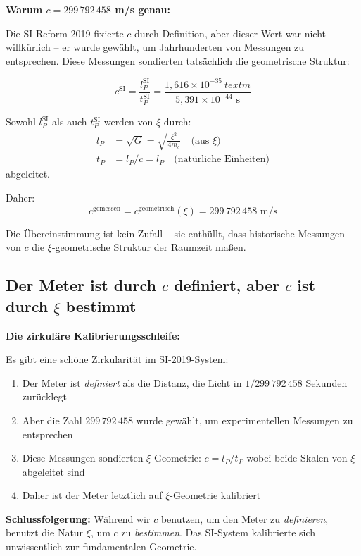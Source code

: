 \documentclass[12pt,a4paper]{article}
\begin{document}
	\begin{keyresult}
		\textbf{Warum $c = 299\,792\,458$ m/s genau:}
		
		Die SI-Reform 2019 fixierte $c$ durch Definition, aber dieser Wert war nicht willk{\"u}rlich -- er wurde gew{\"a}hlt, um Jahrhunderten von Messungen zu entsprechen. Diese Messungen sondierten tats{\"a}chlich die geometrische Struktur:
		
		\begin{equation}
			c^{\text{SI}} = \frac{l_P^{\text{SI}}}{t_P^{\text{SI}}} = \frac{1{,}616 \times 10^{-35} \
	text{ m}}{5{,}391 \times 10^{-44} \text{ s}}
\end{equation}

Sowohl $l_P^{\text{SI}}$ als auch $t_P^{\text{SI}}$ werden von $\xi$ durch:
\begin{align}
l_P &= \sqrt{G} = \sqrt{\frac{\xi^2}{4m_e}} \quad \text{(aus } \xi\text{)} \\
t_P &= l_P/c = l_P \quad \text{(nat{\"u}rliche Einheiten)}
\end{align}
abgeleitet.

Daher:
\begin{equation}
\boxed{c^{\text{gemessen}} = c^{\text{geometrisch}}(\xi) = 299\,792\,458 \text{ m/s}}
\end{equation}

Die {\"U}bereinstimmung ist kein Zufall -- sie enth{\"u}llt, dass historische Messungen von $c$ die $\xi$-geometrische Struktur der Raumzeit ma{\ss}en.
\end{keyresult}

\subsection{Der Meter ist durch $c$ definiert, aber $c$ ist durch $\xi$ bestimmt}

\begin{insight}
\textbf{Die zirkul{\"a}re Kalibrierungsschleife:}

Es gibt eine sch{\"o}ne Zirkularit{\"a}t im SI-2019-System:

\begin{enumerate}
\item Der Meter ist \emph{definiert} als die Distanz, die Licht in $1/299\,792\,458$ Sekunden zur{\"u}cklegt
\item Aber die Zahl $299\,792\,458$ wurde gew{\"a}hlt, um experimentellen Messungen zu entsprechen
\item Diese Messungen sondierten $\xi$-Geometrie: $c = l_P/t_P$ wobei beide Skalen von $\xi$ abgeleitet sind
\item Daher ist der Meter letztlich auf $\xi$-Geometrie kalibriert
\end{enumerate}

\textbf{Schlussfolgerung:} W{\"a}hrend wir $c$ benutzen, um den Meter zu \emph{definieren}, benutzt die Natur $\xi$, um $c$ zu \emph{bestimmen}. Das SI-System kalibrierte sich unwissentlich zur fundamentalen Geometrie.
\end{insight}
\end{document}
